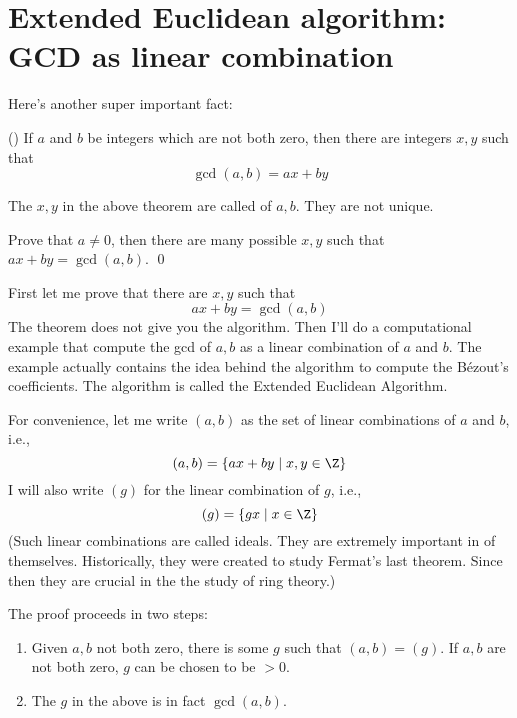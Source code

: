 \section{Extended Euclidean algorithm: GCD as linear combination}

Here's another super important fact:

\begin{thm}
  \textnormal{()}
If $a$ and $b$ be integers which are not both zero,
then there are integers $x,y$ such that
\[
\gcd(a,b) = ax + by
\]
\end{thm}

The $x,y$ in the above theorem are called
of $a,b$.
They are not unique.

\begin{ex}
  Prove that $a \neq 0$, then
  there are many possible $x, y$ such that
  $ax + by = \gcd(a,b)$.
  \qed
\end{ex}


First let me prove that there are $x,y$ such that
\[
ax + by = \gcd(a, b)
\]
The theorem does not give you the algorithm.
Then I'll do a computational example
that compute the gcd of $a,b$ as a linear combination of $a$ and $b$.
The example actually contains the idea behind the algorithm
to compute the B\'ezout's coefficients.
The algorithm is called
the Extended Euclidean Algorithm.

\proof
For convenience, let
me write $(a, b)$ as the set of linear combinations of $a$ and $b$, i.e.,
\[
(a, b) = \{ax + by \mid x,y \in \Z \}
\]
I will also write $(g)$ for the linear combination of $g$, i.e.,
\[
(g) = \{gx \mid x \in \Z \}
\]
(Such linear combinations are called ideals. They are extremely
important in of themselves. Historically, they were created
to study Fermat's last theorem. Since then they are crucial in the
the study of ring theory.)

The proof proceeds in two steps:
\begin{enumerate}[nosep]
\item Given $a,b$ not both zero, there is some $g$ such that
  $(a,b) = (g)$. If $a,b$ are not both zero, $g$ can be chosen to be
  $>0$.
\item The $g$ in the above is in fact $\gcd(a,b)$. 
\end{enumerate}


